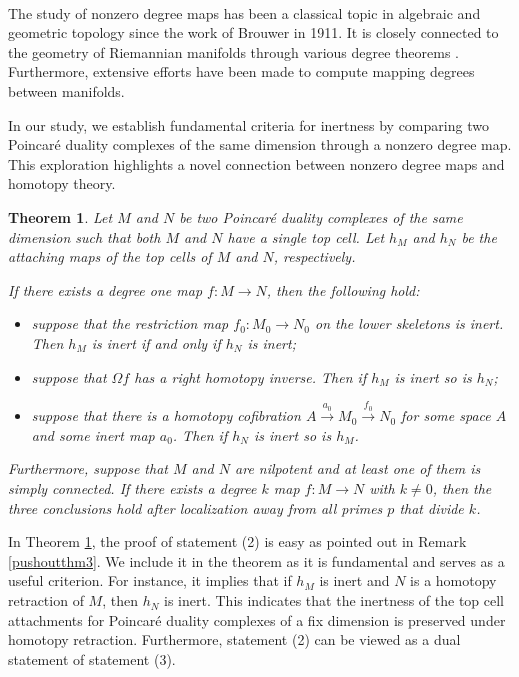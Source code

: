 \documentclass[a4]{amsart}
\newtheorem{theorem}{Theorem}[section]
\theoremstyle{definition}
\begin{document}
\begin{sloppypar}
$\, $

The study of nonzero degree maps has been a classical topic in algebraic and geometric topology since the work of Brouwer \cite{Bro11} in 1911. It is closely connected to the geometry of Riemannian manifolds through various degree theorems \cite{Gro82}. Furthermore, extensive efforts \cite{Wan02, DW03, DW04} have been made to compute mapping degrees between manifolds. 

In our study, we establish fundamental criteria for inertness by comparing two Poincar\'{e} duality complexes of the same dimension through a nonzero degree map. This exploration highlights a novel connection between nonzero degree maps and homotopy theory. 

\begin{theorem}\label{inertdeg1thmintro}
Let $M$ and $N$ be two Poincar\'{e} duality complexes of the same dimension such that both $M$ and $N$ have a single top cell. Let $h_M$ and $h_N$ be the attaching maps of the top cells of $M$ and $N$, respectively. 

If there exists a degree one map $f: M\stackrel{}{\longrightarrow} N$, then the following hold:
\begin{itemize}
\item[(1).] suppose that the restriction map $f_0: M_0\stackrel{}{\longrightarrow} N_0$ on the lower skeletons is inert. Then $h_M$ is inert if and only if $h_N$ is inert; 
\item[(2).] suppose that $\Omega f$ has a right homotopy inverse. Then if $h_M$ is inert so is $h_N$;
\item[(3).] suppose that there is a homotopy cofibration $A\stackrel{a_0}{\longrightarrow} M_0 \stackrel{f_0}{\longrightarrow} N_0$ for some space $A$ and some inert map $a_0$. Then if $h_N$ is inert so is $h_M$.
\end{itemize}

Furthermore, suppose that $M$ and $N$ are nilpotent and at least one of them is simply connected. 
If there exists a degree $k$ map $f: M\stackrel{}{\longrightarrow} N$ with $k\neq 0$, then the three conclusions hold after localization away from all primes $p$ that divide $k$.
\end{theorem}

In Theorem \ref{inertdeg1thmintro}, the proof of statement (2) is easy as pointed out in Remark \ref{pushoutthm3}. We include it in the theorem as it is fundamental and serves as a useful criterion. For instance, it implies that if $h_M$ is inert and $N$ is a homotopy retraction of $M$, then $h_N$ is inert. This indicates that the inertness of the top cell attachments for Poincar\'{e} duality complexes of a fix dimension is preserved under homotopy retraction. Furthermore, statement (2) can be viewed as a dual statement of statement (3). 


\end{sloppypar}
\end{document}
